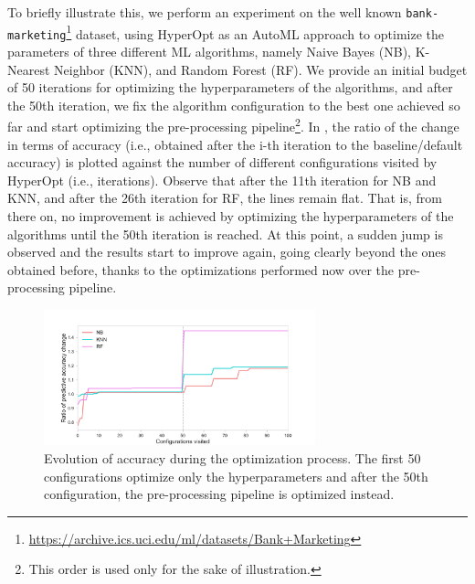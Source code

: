 To briefly illustrate this, we perform an experiment on the well known \texttt{bank-marketing}\footnote{\url{https://archive.ics.uci.edu/ml/datasets/Bank+Marketing}} dataset, using HyperOpt \cite{HyperOptICML13} as an AutoML approach to optimize the parameters of three different ML algorithms, namely Naive Bayes (NB), K-Nearest Neighbor (KNN), and Random Forest (RF).
We provide an initial budget of 50 iterations for optimizing the hyperparameters of the algorithms, and after the 50th iteration, we fix the algorithm configuration to the best one achieved so far and start optimizing the pre-processing pipeline\footnote{This order is used only for the sake of illustration.}.
In , the ratio of the change in terms of accuracy (i.e., obtained after the i-th iteration to the baseline/default accuracy) is plotted against the number of different configurations visited by HyperOpt (i.e., iterations).
Observe that after the 11th iteration for NB and KNN, and after the 26th iteration for RF, the lines remain flat.
That is, from there on, no improvement is achieved by optimizing the hyperparameters of the algorithms until the 50th iteration is reached. At this point, a sudden jump is observed and the results start to improve again, going clearly beyond the ones obtained before, thanks to the optimizations performed now over the pre-processing pipeline.

\begin{figure}[t]
    \centering
    \includegraphics[width=0.7\textwidth]{chapters/data-centric/supervised/img/pre-processing-impact.pdf}
    \caption{Evolution of accuracy during the optimization process. The first 50 configurations optimize only the hyperparameters and after the 50th configuration, the pre-processing pipeline is optimized instead.}
    \label{effective-fig:pre-processing-impact}
\end{figure}

